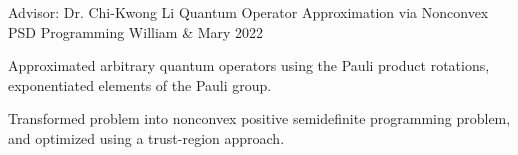 \begin{cventries}
\cventry
{Advisor: Dr. Chi-Kwong Li}
{Quantum Operator Approximation via Nonconvex PSD Programming}
{William \& Mary}
{2022}
{{\begin{cvitems}
\item Approximated arbitrary quantum operators using the Pauli product rotations, exponentiated elements of the Pauli group. 
\item Transformed problem into nonconvex positive semidefinite programming problem, and optimized using a trust-region approach.
\end{cvitems}
}}


\end{cventries}
